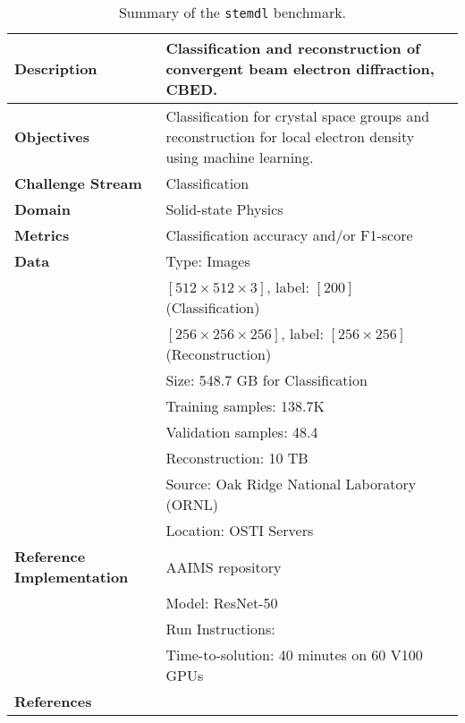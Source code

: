 \begin{small}
\begin{table}
    \caption{Summary of the {\tt stemdl} benchmark.}\label{tab:stemdl-summary}
    \begin{tabular}{p{}p{}}
    \hline
    \hline
    {\bf Description}
    &
    Classification and reconstruction of convergent beam electron
    diffraction, CBED. \\
    \hline
    {\bf Objectives}
    &
    Classification for crystal space groups and reconstruction for local
    electron density using machine learning.
    \\
    \hline
    {\bf Challenge Stream} & Classification\\
    \hline
    {\bf Domain} & Solid-state Physics\\
    \hline
    {\bf Metrics} &  Classification accuracy and/or F1-score\\
    \hline
    {\bf Data} 
        & Type: Images \\
        &  $[512\times512\times3]$, label: $[200]$ (Classification) \\
        &  $[256\times256\times256]$, label: $[256\times256]$ (Reconstruction) \\
        & Size: 548.7 GB for Classification\\
        & Training samples: 138.7K\\
        & Validation samples: 48.4\\
        & Reconstruction: 10 TB \\
        & Source: Oak Ridge National Laboratory (ORNL) \\
        & Location: OSTI Servers~\cite{laanait-scanning}\\
    \hline
    {\bf Reference Implementation} & AAIMS repository~\cite{stemdl-benchmark} \\
    & Model: ResNet-50 \\
    & Run Instructions: \cite{stemdl-benchmark} \\
    & Time-to-solution: 40 minutes on 60 V100 GPUs \\
    \hline
    {\bf References} & \cite{laanait-scanning,pan-20,laanait-ms-19} \\
    \hline
    \hline
    \end{tabular}
\end{table}
\end{small}


